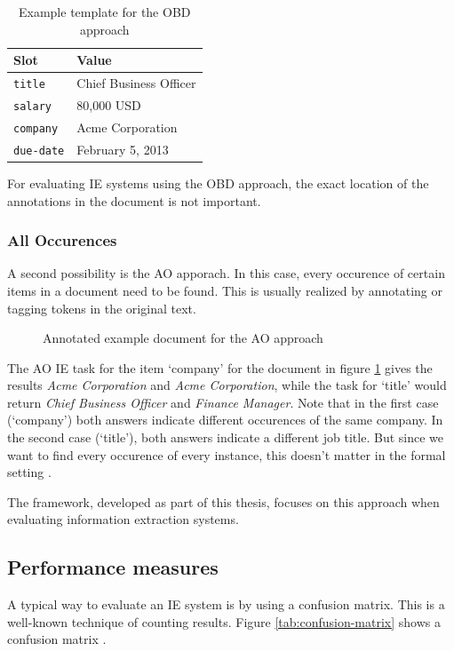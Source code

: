 \begin{table}[H]
\centering
\begin{tabular*}{\textwidth}{ll}
	\toprule
	Slot & Value \\
	\midrule
	\texttt{title} & Chief Business Officer \\
	\texttt{salary} & 80,000 USD \\
	\texttt{company} & Acme Corporation \\
	\texttt{due-date} & February 5, 2013 \\
	\bottomrule
\end{tabular*}
\caption{Example template for the \gls{OBD} approach}
\label{tbl:example-obd}
\end{table}

For evaluating \gls{IE} systems using the \gls{OBD} approach, the exact location of the annotations in the document is not important. \cite{Sitter:2004}

\subsubsection{All Occurences}
A second possibility is the \gls{AO} apporach. In this case, every occurence of certain items in a document need to be found. This is usually realized by annotating or tagging tokens in the original text. \cite{Sitter:2004}

\begin{figure}[H]

\caption{Annotated example document for the \gls{AO} approach}
\label{fig:example-ao}
\end{figure}

The \gls{AO} \gls{IE} task for the item \enquote*{company} for the document in figure \ref{fig:example-ao} gives the results \textit{Acme Corporation} and \textit{Acme Corporation}, while the task for \enquote*{title} would return \textit{Chief Business Officer} and \textit{Finance Manager}. Note that in the first case (\enquote*{company}) both answers indicate different occurences of the same company. In the second case (\enquote*{title}), both answers indicate a different job title. But since we want to find every occurence of every instance, this doesn't matter in the formal setting \cite{Sitter:2004}.

The framework, developed as part of this thesis, focuses on this approach when evaluating information extraction systems.

\subsection{Performance measures}
A typical way to evaluate an IE system is by using a confusion matrix. This is a well-known
technique of counting results. Figure \ref{tab:confusion-matrix} shows a confusion matrix \cite{Sitter:2004}.


